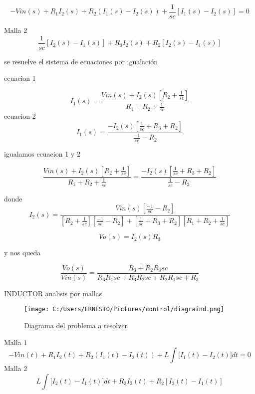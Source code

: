 \documentclass{article}
\begin{document}
\begin{equation}
-Vin(s)+R_{1}I_{2}(s)+R_{2}(I_{1}(s)-I_{2}(s))+\frac{1}{sc}[I_{1}(s)-I_{2}(s)]=0
\end{equation}


Malla 2
\begin{equation}
\frac{1}{sc}[I_{2}(s)-I_{1}(s)]+R_{3}I_{2}(s)+R_{2}[I_{2}(s)-I_{1}(s)]
\end{equation}

se resuelve el sistema de ecuaciones por igualación

ecuacion 1

\begin{equation}
I_{1}(s)=\frac{Vin(s)+I_{2}(s)[R_{2}+\frac{1}{sc}]}{R_{1}+R_{2}+\frac{1}{sc}}
\end{equation}
ecuacion 2
\begin{equation}
I_{1}(s)=\frac{-I_{2}(s)[\frac{1}{sc}+R_{3}+R_{2}]}{\frac{-1}{sc}-R_{2}}
\end{equation}

igualamos ecuacion 1 y 2

\begin{equation}
\frac{Vin(s)+I_{2}(s)[R_{2}+\frac{1}{sc}]}{R_{1}+R_{2}+\frac{1}{sc}}=\frac{-I_{2}(s)[\frac{1}{sc}+R_{3}+R_{2}]}{\frac{1}{sc}-R_{2}}
\end{equation}


donde
\begin{equation}
I_{2}(s)=\frac{Vin(s)[\frac{-1}{sc}-R_{2}]}{[R_{2}+\frac{1}{sc}][\frac{-1}{sc}-R_{2}]+[\frac{1}{sc}+R_{3}+R_{2}][R_{1}+R_{2}+\frac{1}{sc}]}
\end{equation}

\begin{equation}
Vo(s)=I_{2}(s)R_{3}
\end{equation}

y nos queda

\begin{equation}
\frac{Vo(s)}{Vin(s)}=\frac{R_{3}+R_{2}R_{3}sc}{R_{3}R_{1}sc+R_{3}R_{2}sc+R_{2}R_{1}sc+R_{3}}
\end{equation}

INDUCTOR analisis por mallas
\begin{figure}[h!]
	\centering
	\texttt{[image: C:/Users/ERNESTO/Pictures/control/diagraind.png]}
	\caption{Diagrama del problema a resolver}
\end{figure}

Malla 1
\begin{equation}
-Vin(t)+R_{1}I_{2}(t)+R_{2}(I_{1}(t)-I_{2}(t))+L\int{[I_{1}(t)-I_{2}(t)}]dt=0
\end{equation}
Malla 2
\begin{equation}
L\int{[I_{2}(t)-I_{1}(t)}]dt+R_{3}I_{2}(t)+R_{2}[I_{2}(t)-I_{1}(t)]
\end{equation}
\end{document}
